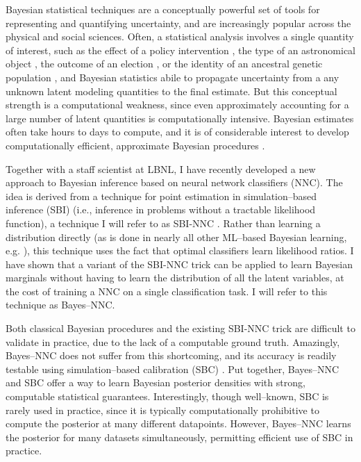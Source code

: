 Bayesian statistical techniques are a conceptually powerful set of tools for
representing and quantifying uncertainty, and are increasingly popular across
the physical and social sciences.  Often, a statistical analysis involves a
single quantity of interest, such as the effect of a policy intervention
\citep{meager:2019:microcredit}, the type of an astronomical object
\citep{regier:2019:cataloging}, the outcome of an election
\citep{economist:2020:election}, or the identity of an ancestral genetic
population \citep{pritchard:2000:inference}, and Bayesian statistics abile to
propagate uncertainty from a any unknown latent modeling quantities to the final
estimate.  But this conceptual strength is a computational weakness, since even
approximately accounting for a large number of latent quantities is
computationally intensive. Bayesian estimates often take hours to days to
compute, and it is of considerable interest to develop computationally
efficient, approximate Bayesian procedures \citep{blei:2017:variational,aabi}.

Together with a staff scientist at LBNL, I have recently developed a new
approach to Bayesian inference based on neural network classifiers (NNC). The
idea is derived from a technique for point estimation in simulation--based
inference (SBI) (i.e., inference in problems without a tractable likelihood
function), a technique I will refer to as SBI-NNC
\citep{cranmer:2020:frontierofsimulation}.  Rather than learning a distribution
directly (as is done in nearly all other ML--based Bayesian learning, e.g.
\citep{papamakarios:2021:normalizing}), this technique uses the fact that
optimal classifiers learn likelihood ratios. I have shown that a variant of the
SBI-NNC trick can be applied to learn Bayesian marginals without having to learn
the distribution of all the latent variables, at the cost of training a NNC on a
single classification task.  I will refer to this technique as Bayes--NNC.

Both classical Bayesian procedures and the existing SBI-NNC trick are difficult
to validate in practice, due to the lack of a computable ground truth.
Amazingly, Bayes--NNC does not suffer from this shortcoming, and its accuracy is
readily testable using simulation--based calibration (SBC)
\citep{talts:2018:sbc}.  Put together, Bayes--NNC and SBC offer a way to learn
Bayesian posterior densities with strong, computable statistical guarantees.
Interestingly, though well--known, SBC is rarely used in practice, since it is
typically computationally prohibitive to compute the posterior at many different
datapoints.  However, Bayes--NNC learns the posterior for many datasets
simultaneously, permitting efficient use of SBC in practice.  

